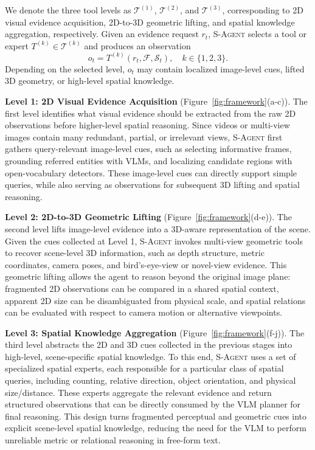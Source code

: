 \documentclass{llmxive}
\begin{document}
% 
We denote the three tool levels as $\mathcal{T}^{(1)}$, $\mathcal{T}^{(2)}$, and $\mathcal{T}^{(3)}$, corresponding to 2D visual evidence acquisition, 2D-to-3D geometric lifting, and spatial knowledge aggregation, respectively. 
Given an evidence request $r_t$, \textsc{S-Agent} selects a tool or expert $T^{(k)} \in \mathcal{T}^{(k)}$ and produces an observation
\[
    o_t = T^{(k)}(r_t, \mathcal{F}, \mathcal{S}_t), \quad k \in \{1,2,3\}.
\]
Depending on the selected level, $o_t$ may contain localized image-level cues, lifted 3D geometry, or high-level spatial knowledge.


\textbf{Level 1: 2D Visual Evidence Acquisition} (Figure~\ref{fig:framework}(a-c)).
The first level identifies what visual evidence should be extracted from the raw 2D observations before higher-level spatial reasoning. 
Since videos or multi-view images contain many redundant, partial, or irrelevant views, \textsc{S-Agent} first gathers query-relevant image-level cues, such as selecting informative frames, grounding referred entities with VLMs, and localizing candidate regions with open-vocabulary detectors. 
These image-level cues can directly support simple queries, while also serving as observations for subsequent 3D lifting and spatial reasoning.

\textbf{Level 2: 2D-to-3D Geometric Lifting} (Figure~\ref{fig:framework}(d-e)). 
The second level lifts image-level evidence into a 3D-aware representation of the scene. 
Given the cues collected at Level 1, \textsc{S-Agent} invokes multi-view geometric tools to recover scene-level 3D information, such as depth structure, metric coordinates, camera poses, and bird's-eye-view or novel-view evidence.
% 
This geometric lifting allows the agent to reason beyond the original image plane: fragmented 2D observations can be compared in a shared spatial context, apparent 2D size can be disambiguated from physical scale, and spatial relations can be evaluated with respect to camera motion or alternative viewpoints.

\textbf{Level 3: Spatial Knowledge Aggregation} (Figure~\ref{fig:framework}(f-j)).
The third level abstracts the 2D and 3D cues collected in the previous stages into high-level, scene-specific spatial knowledge. 
To this end, \textsc{S-Agent} uses a set of specialized spatial experts, each responsible for a particular class of spatial queries, including counting, relative direction, object orientation, and physical size/distance. 
These experts aggregate the relevant evidence and return structured observations that can be directly consumed by the VLM planner for final reasoning. 
This design turns fragmented perceptual and geometric cues into explicit scene-level spatial knowledge, reducing the need for the VLM to perform unreliable metric or relational reasoning in free-form text.
\end{document}
